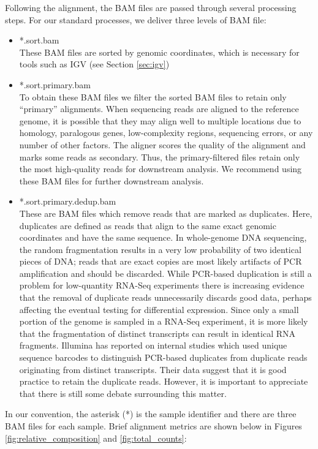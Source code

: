 \documentclass{article}
\begin{document}
{Following the alignment, the BAM files are passed through several processing steps.  For our standard processes, we deliver three levels of BAM file:
\begin{itemize}
\item *.sort.bam \\
These BAM files are sorted by genomic coordinates, which is necessary for tools such as IGV (see Section \ref{sec:igv})
\item *.sort.primary.bam \\
To obtain these BAM files we filter the sorted BAM files to retain only ``primary'' alignments.  When sequencing reads are aligned to the reference genome, it is possible that they may align well to multiple locations due to homology, paralogous genes, low-complexity regions, sequencing errors, or any number of other factors.  The aligner scores the quality of the alignment and marks some reads as secondary.  Thus, the primary-filtered files retain only the most high-quality reads for downstream analysis.  We recommend using these BAM files for further downstream analysis.  
\item *.sort.primary.dedup.bam \\
These are BAM files which remove reads that are marked as duplicates.  Here, duplicates are defined as reads that align to the same exact genomic coordinates and have the same sequence.  In whole-genome DNA sequencing, the random fragmentation results in a very low probability of two identical pieces of DNA; reads that are exact copies are most likely artifacts of PCR amplification and should be discarded.  While PCR-based duplication is still a problem for low-quantity RNA-Seq experiments there is increasing evidence that the removal of duplicate reads unnecessarily discards good data, perhaps affecting the eventual testing for differential expression.  Since only a small portion of the genome is sampled in a RNA-Seq experiment, it is more likely that the fragmentation of distinct transcripts can result in identical RNA fragments.  Illumina has reported on internal studies which used unique sequence barcodes to distinguish PCR-based duplicates from duplicate reads originating from distinct transcripts.  Their data suggest that it is good practice to retain the duplicate reads.  However, it is important to appreciate that there is still some debate surrounding this matter.  
\end{itemize}

In our convention, the asterisk (*) is the sample identifier and there are three BAM files for each sample.
Brief alignment metrics are shown below in Figures \ref{fig:relative_composition} and \ref{fig:total_counts}:

}
\end{document}
